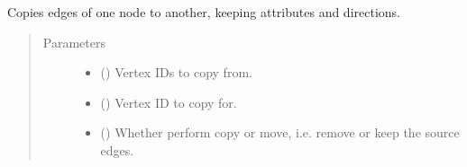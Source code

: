 \documentclass[letterpaper,10pt,english]{sphinxmanual}
\begin{document}
\begin{fulllineitems}
\begin{fulllineitems}
\end{fulllineitems}


\begin{fulllineitems}
\label{\detokenize{main:pypath.main.PyPath.communities}}
\end{fulllineitems}


\begin{fulllineitems}
\label{\detokenize{main:pypath.main.PyPath.consistency}}
\end{fulllineitems}


\begin{fulllineitems}
\label{\detokenize{main:pypath.main.PyPath.copy_edges}}
Copies edges of one node to another,
keeping attributes and directions.
\begin{quote}\begin{description}
\item[{Parameters}] \leavevmode\begin{itemize}
\item {} 
 () \textendash{} Vertex IDs to copy from.

\item {} 
 () \textendash{} Vertex ID to copy for.

\item {} 
 () \textendash{} Whether perform copy or move, i.e. remove or keep
the source edges.

\end{itemize}

\end{description}\end{quote}

\end{fulllineitems}


\end{fulllineitems}
\end{document}
